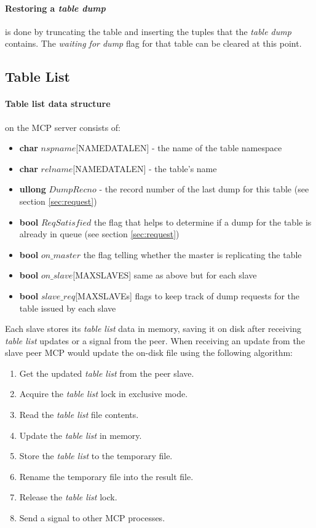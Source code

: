\documentclass{article}
\newcommand{\tabdump}{\emph{table dump}}
\newcommand{\tablist}{\emph{table list}}
\begin{document}
\paragraph{Restoring a \tabdump} is done by
truncating the table and
inserting the tuples that the \tabdump{} contains.
The \emph{waiting for dump} flag for that table 
can be cleared at this point.

\newpage
\subsection{Table List}

\paragraph{Table list data structure} on the MCP server consists of:

\begin{itemize}

\item {\bf char} $nspname$[NAMEDATALEN] - the name of the table namespace
\item {\bf char} $relname$[NAMEDATALEN] - the table's name
\item {\bf ullong} $DumpRecno$ - the record number of the last dump for this
table (see section \ref{sec:request})
\item {\bf bool} $ReqSatisfied$ the flag that helps  to determine if a dump 
for the table is already in queue (see section \ref{sec:request})
\item {\bf bool} $on\_master$ the flag telling whether the master is replicating
the table
\item {\bf bool} $on\_slave$[MAXSLAVES] same as above but for each slave
\item {\bf bool} $slave\_req$[MAXSLAVEs] flags to keep track of dump requests
for the table issued by each slave

\end{itemize}

Each slave stores its \tablist{} data in memory, 
saving it on disk after receiving \tablist{} updates 
or a signal from the peer. When receiving an update from 
the slave peer MCP would update the on-disk file using the
following algorithm:

\begin{enumerate}

\item Get the updated \tablist{} from the peer slave.
\item Acquire the \tablist{} lock in exclusive mode.
\item Read the \tablist{} file contents.
\item Update the \tablist{} in memory.
\item Store the \tablist{} to the temporary file.
\item Rename the temporary file into the result file.
\item Release the \tablist{} lock.
\item Send a signal to other  MCP processes.

\end{enumerate}
\end{document}
